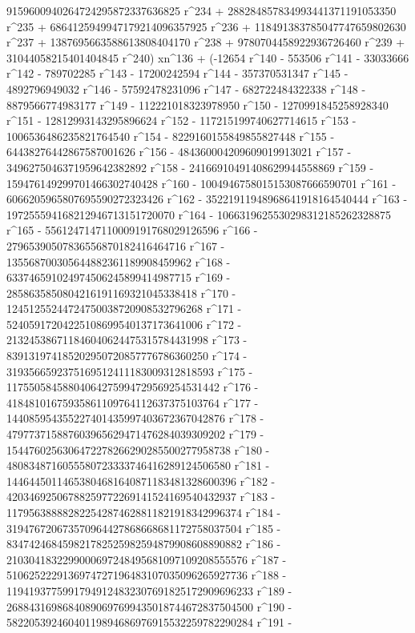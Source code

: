        9159600940264724295872337636825 r^234 + 
       288284857834993441371191053350 r^235 + 
       6864125949947179214096357925 r^236 + 
       118491383785047747659802630 r^237 + 
       1387695663588613808404170 r^238 + 
       9780704458922936726460 r^239 + 
       31044058215401404845 r^240) xn^136 + (-12654 r^140 - 
       553506 r^141 - 33033666 r^142 - 789702285 r^143 - 
       17200242594 r^144 - 357370531347 r^145 - 4892796949032 r^146 - 
       57592478231096 r^147 - 682722484322338 r^148 - 
       8879566774983177 r^149 - 112221018323978950 r^150 - 
       1270991845258928340 r^151 - 12812993143295896624 r^152 - 
       117215199740627714615 r^153 - 1006536486235821764540 r^154 - 
       8229160155849855827448 r^155 - 64438276442867587001626 r^156 - 
       484360004209609019913021 r^157 - 
       3496275046371959642382892 r^158 - 
       24166910491408629944558869 r^159 - 
       159476149299701466302740428 r^160 - 
       1004946758015153087666590701 r^161 - 
       6066205965807695590272323426 r^162 - 
       35221911948968641918164540444 r^163 - 
       197255594168212946713151720070 r^164 - 
       1066319625530298312185262328875 r^165 - 
       5561247147110009191768029126596 r^166 - 
       27965390507836556870182416464716 r^167 - 
       135568700305644882361189908459962 r^168 - 
       633746591024974506245899414987715 r^169 - 
       2858635850804216191169321045338418 r^170 - 
       12451255244724750038720908532796268 r^171 - 
       52405917204225108699540137173641006 r^172 - 
       213245386711846040624475315784431998 r^173 - 
       839131974185202950720857776786360250 r^174 - 
       3193566592375169512411183009312818593 r^175 - 
       11755058458804064275994729569254531442 r^176 - 
       41848101675935861109764112637375103764 r^177 - 
       144085954355227401435997403672367042876 r^178 - 
       479773715887603965629471476284039309202 r^179 - 
       1544760256306472278266290285500277958738 r^180 - 
       4808348716055580723333746416289124506580 r^181 - 
       14464450114653804681640871183481328600396 r^182 - 
       42034692506788259772269141524169540432937 r^183 - 
       117956388882822542874628811821918342996374 r^184 - 
       319476720673570964427868668681172758037504 r^185 - 
       834742468459821782525982594879908608890882 r^186 - 
       2103041832299000697248495681097109208555576 r^187 - 
       5106252229136974727196483107035096265927736 r^188 - 
       11941937759917949124832307691825172909696233 r^189 - 
       26884316986840890697699435018744672837504500 r^190 - 
       58220539246040119894686976915532259782290284 r^191 - 
